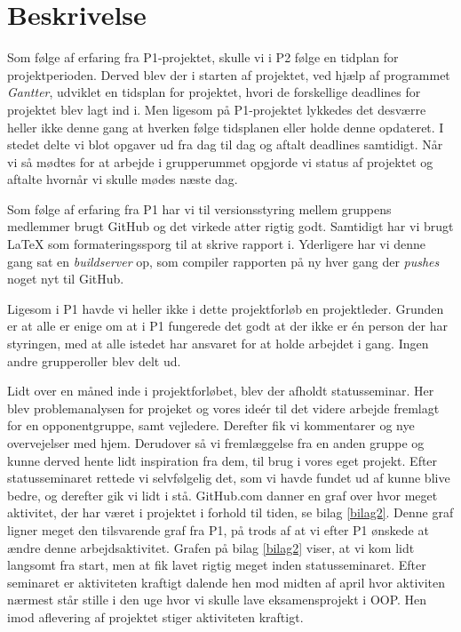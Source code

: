 \section{Beskrivelse}
Som følge af erfaring fra P1-projektet, skulle vi i P2 følge en tidplan for projektperioden. Derved blev der i starten af projektet, ved hjælp af programmet \textit{Gantter}, udviklet en tidsplan for projektet, hvori de forskellige deadlines for projektet blev lagt ind i. Men ligesom på P1-projektet lykkedes det desværre heller ikke denne gang at hverken følge tidsplanen eller holde denne opdateret. I stedet delte vi blot opgaver ud fra dag til dag og aftalt deadlines samtidigt. Når vi så mødtes for at arbejde i grupperummet opgjorde vi status af projektet og aftalte hvornår vi skulle mødes næste dag. 

Som følge af erfaring fra P1 har vi til versionsstyring mellem gruppens medlemmer brugt GitHub og det virkede atter rigtig godt. Samtidigt har vi brugt \LaTeX{} som formateringssporg til at skrive rapport i. Yderligere har vi denne gang sat en \textit{buildserver} op, som compiler rapporten på ny hver gang der \textit{pushes} noget nyt til GitHub. 

Ligesom i P1 havde vi heller ikke i dette projektforløb en projektleder. Grunden er at alle er enige om at i P1 fungerede det godt at der ikke er én person der har styringen, med at alle istedet har ansvaret for at holde arbejdet i gang. Ingen andre grupperoller blev delt ud.  

Lidt over en måned inde i projektforløbet, blev der afholdt statusseminar. Her blev problemanalysen for projeket og vores ideér til det videre arbejde fremlagt for en opponentgruppe, samt vejledere. Derefter fik vi kommentarer og nye overvejelser med hjem. Derudover så vi fremlæggelse fra en anden gruppe og kunne derved hente lidt inspiration fra dem, til brug i vores eget projekt. Efter statusseminaret rettede vi selvfølgelig det, som vi havde fundet ud af kunne blive bedre, og derefter gik vi lidt i stå. GitHub.com danner en graf over hvor meget aktivitet, der har været i projektet i forhold til tiden, se bilag \ref{bilag2}. Denne graf ligner meget den tilsvarende graf fra P1, på trods af at vi efter P1 ønskede at ændre denne arbejdsaktivitet. Grafen på bilag \ref{bilag2} viser, at vi kom lidt langsomt fra start, men at fik lavet rigtig meget inden statusseminaret. Efter seminaret er aktiviteten kraftigt dalende hen mod midten af april hvor aktiviten nærmest står stille i den uge hvor vi skulle lave eksamensprojekt i OOP. Hen imod aflevering af projektet stiger aktiviteten kraftigt. 

